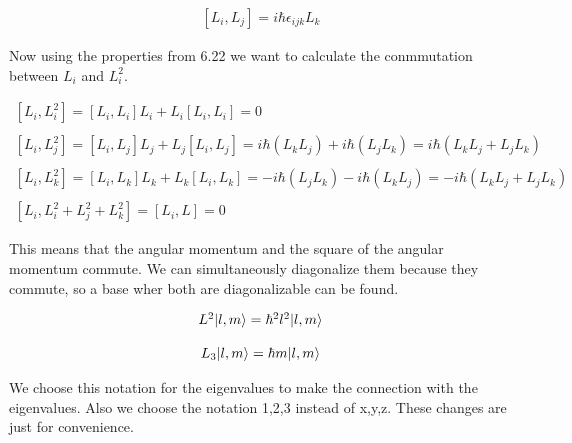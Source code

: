 
\begin{equation}
  \begin{array}{c}
    [L_i,L_j] = i\hbar \epsilon_{ijk} L_k
  \end{array}
\end{equation}

Now using the properties from 6.22 we want to calculate the conmmutation between $L_i$ and $L_i^2$.

\begin{equation}
  \begin{array}{c}
    [L_i,L_i^2] = [L_i,L_i]L_i + L_i[L_i,L_i] = 0
    \\

    \\
    \left[ L_i,L_j^2 \right] = \left[L_i,L_j\right]L_j + L_j[L_i,L_j] = i \hbar \left(L_k L_j \right) + i \hbar \left( L_j L_k \right) = i \hbar (L_k L_j + L_j L_k)
    \\

    \\
    \left[L_i,L_k^2\right] = [L_i,L_k]L_k + L_k[L_i,L_k] = -i\hbar\left(L_j L_k\right)-i\hbar\left(L_k L_j\right) = -i\hbar(L_k L_j + L_j L_k)
    \\

    \\
    \left[L_i,L_i^2 +L_j^2+L_k^2\right] = [L_i, L] = 0
  \end{array}
\end{equation}

This means that the angular momentum and the square of the angular momentum commute. We can simultaneously diagonalize them because they commute, so a base wher both are diagonalizable can be found.

\begin{equation}
  \label{9.8}
  \begin{array}{c}
    L^2 \lvert l,m\rangle = \hbar^2 l^2 \lvert l,m\rangle
    \\

    \\
    L_3 \lvert l,m\rangle = \hbar m \lvert l,m\rangle
  \end{array}
\end{equation}

We choose this notation for the eigenvalues to make the connection with the eigenvalues. Also we choose the notation 1,2,3 instead of x,y,z. These changes are just for convenience.

